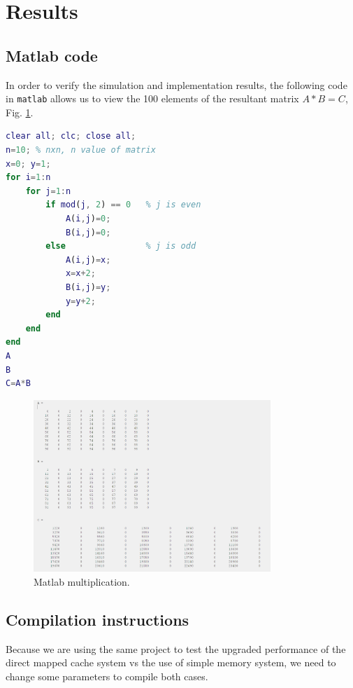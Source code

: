 \documentclass[]{article}
\begin{document}
\section{Results}
\subsection{Matlab code}
In order to verify the simulation and implementation results, the following code in \verb|matlab| allows us to view the 100 elements of the resultant matrix $A*B = C$, Fig. \ref{fig:matlab}.

\begin{lstlisting}[language=matlab, caption={Matlab multiplication.}, label={}]
clear all; clc; close all;
n=10; % nxn, n value of matrix
x=0; y=1;
for i=1:n 
	for j=1:n
		if mod(j, 2) == 0 	% j is even
			A(i,j)=0;
			B(i,j)=0;
		else                % j is odd
			A(i,j)=x;
			x=x+2;
			B(i,j)=y;
			y=y+2;
		end		
	end
end
A
B
C=A*B
\end{lstlisting} 

\begin{figure}[H]
	\centering
	\includegraphics[width=0.8\textwidth]{10x10_matrix_mult}
	\caption{Matlab multiplication.}
	\label{fig:matlab}
\end{figure}

\subsection{Compilation instructions}\label{comp}
Because we are using the same project to test the upgraded performance of the direct mapped cache system vs the use of simple memory system, we need to change some parameters to compile both cases.
\end{document}
